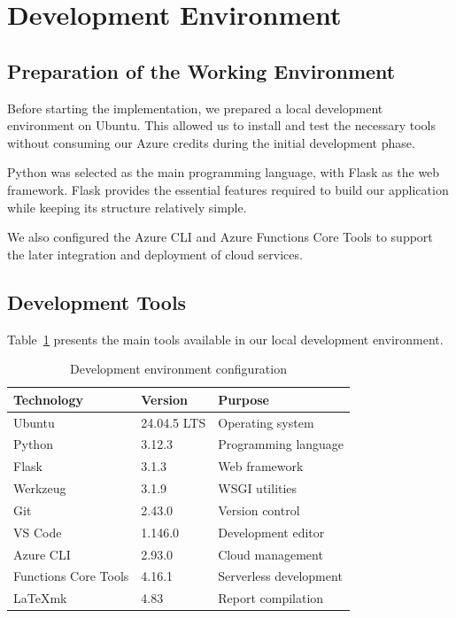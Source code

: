 \section{Development Environment}

\subsection{Preparation of the Working Environment}

Before starting the implementation, we prepared a local
development environment on Ubuntu. This allowed us to
install and test the necessary tools without consuming
our Azure credits during the initial development phase.

Python was selected as the main programming language,
with Flask as the web framework. Flask provides the
essential features required to build our application
while keeping its structure relatively simple.

We also configured the Azure CLI and Azure Functions
Core Tools to support the later integration and
deployment of cloud services.

\subsection{Development Tools}

Table~\ref{tab:environment} presents the main tools
available in our local development environment.

\begin{table}[htbp]
    \centering
    \caption{Development environment configuration}
    \label{tab:environment}

    \begin{tabular}{lll}
        \toprule
        \textbf{Technology} &
        \textbf{Version} &
        \textbf{Purpose} \\
        \midrule
        Ubuntu & 24.04.5 LTS & Operating system \\
        Python & 3.12.3 & Programming language \\
        Flask & 3.1.3 & Web framework \\
        Werkzeug & 3.1.9 & WSGI utilities \\
        Git & 2.43.0 & Version control \\
        VS Code & 1.146.0 & Development editor \\
        Azure CLI & 2.93.0 & Cloud management \\
        Functions Core Tools & 4.16.1 & Serverless development \\
        LaTeXmk & 4.83 & Report compilation \\
        \bottomrule
    \end{tabular}
\end{table}


